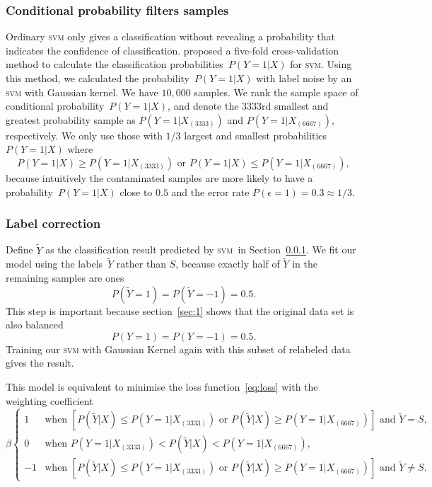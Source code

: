 \documentclass[12pt]{article} %
\newcommand{\svm}{\textsc{svm}}
\begin{document}
\subsubsection{Conditional probability filters samples}\label{2nd2}
Ordinary \textsc{svm} only gives a classification without revealing a probability that indicates the confidence of classification. 
\citet{Wu03probabilityestimates} proposed a five-fold cross-validation method to calculate the classification probabilities~$P(Y=1|X)$ for \textsc{svm}. 
Using this method, we calculated the probability~$P(Y=1|X)$ with label noise by an \textsc{svm} with Gaussian kernel. 
We have $10,000$ samples.
We rank the sample space of conditional probability~$P(Y=1|X)$, and denote the $3333$rd smallest and greatest probability sample as $P(Y=1|X_{(3333)})$ and $P(Y=1|X_{(6667)})$, respectively. 
We only use those with $1/3$ largest and smallest probabilities~$P(Y=1|X)$ where 
\begin{equation*}
P(Y=1|X)\geq P(Y=1|X_{(3333)}) \text{ or } P(Y=1|X)\leq P(Y=1|X_{(6667)}),  
\end{equation*}
because intuitively the contaminated samples are more likely to have a probability~$P(Y=1|X)$ close to $0.5$ and the error rate $P(\epsilon=1)=0.3\approx 1/3$. %
\subsubsection{Label correction}
Define $\tilde Y$ as the classification result predicted by \svm\ in Section~\ref{2nd2}. We fit our model using the labels~$\tilde Y$ rather than $S$, because exactly half of $\tilde Y$ in the remaining samples are ones 
\begin{equation*}
P(\tilde Y=1)=P(\tilde Y=-1)=0.5.
\end{equation*}
This step is important because section~\ref{sec:1} shows that the original data set is also balanced 
\begin{equation*}
P(Y=1)=P(Y=-1)=0.5.
\end{equation*} 
Training our \textsc{svm} with Gaussian Kernel again with this subset of relabeled data gives the result.

This model is equivalent to minimise the loss function~\eqref{eq:loss} with the weighting coefficient
\begin{equation*}
\beta\begin{cases}
1 & \text{when }\left[P(\tilde{Y}|X)\leq P(Y=1|X_{(3333)})\text{ or }P(\tilde{Y}|X)\geq P(Y=1|X_{(6667)})\right]\text{ and }\tilde{Y}=S,\\
0 & \text{when }P(Y=1|X_{(3333)})<P(\tilde{Y}|X)<P(Y=1|X_{(6667)}),\\
-1 & \text{when }\left[P(\tilde{Y}|X)\leq P(Y=1|X_{(3333)})\text{ or }P(\tilde{Y}|X)\geq P(Y=1|X_{(6667)})\right]\text{ and }\tilde{Y}\neq S.
\end{cases}
\end{equation*}
\end{document}
